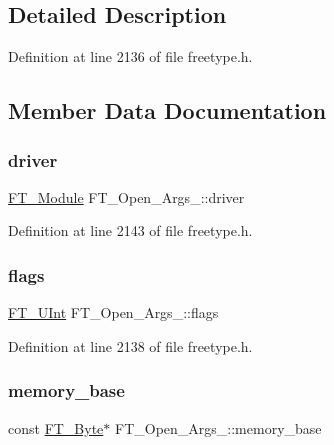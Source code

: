 \subsection{Detailed Description}


Definition at line 2136 of file freetype.\+h.



\subsection{Member Data Documentation}
\mbox{\label{struct_f_t___open___args___a7c01bd7e34a440c3e89141ee521e2646}} 
\subsubsection{\texorpdfstring{driver}{driver}}
{\footnotesize\ttfamily \mbox{\hyperlink{freetype_8h_a660c1bb333747abacdc433b7d73ca59b}{F\+T\+\_\+\+Module}} F\+T\+\_\+\+Open\+\_\+\+Args\+\_\+\+::driver}



Definition at line 2143 of file freetype.\+h.

\mbox{\label{struct_f_t___open___args___a2e3e6b9284fe8b4d9833e247a19181fa}} 
\subsubsection{\texorpdfstring{flags}{flags}}
{\footnotesize\ttfamily \mbox{\hyperlink{fttypes_8h_abcb8db4dbf35d2b55a9e8c7b0926dc52}{F\+T\+\_\+\+U\+Int}} F\+T\+\_\+\+Open\+\_\+\+Args\+\_\+\+::flags}



Definition at line 2138 of file freetype.\+h.

\mbox{\label{struct_f_t___open___args___a1231da51bc58922096b3bc603bb2ffb0}} 
\subsubsection{\texorpdfstring{memory\_base}{memory\_base}}
{\footnotesize\ttfamily const \mbox{\hyperlink{fttypes_8h_a51f26183ca0c9f4af958939648caeccd}{F\+T\+\_\+\+Byte}}$\ast$ F\+T\+\_\+\+Open\+\_\+\+Args\+\_\+\+::memory\+\_\+base}



